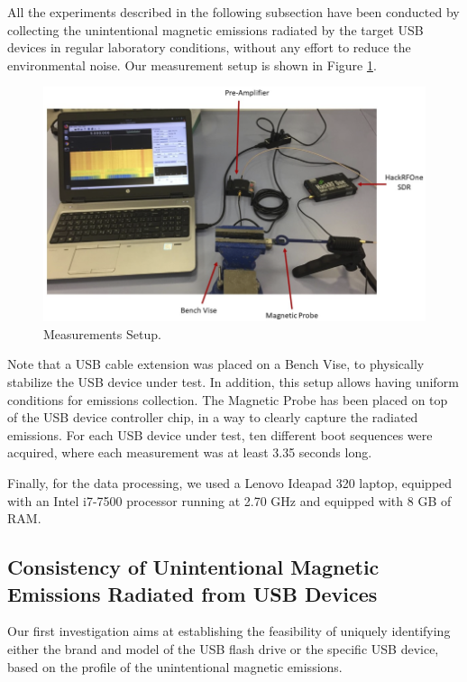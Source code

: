 \documentclass[acmsmall, authorversion]{acmart}
\begin{document}
All the experiments described in the following subsection have been conducted by collecting the unintentional magnetic emissions radiated by the target USB devices in regular laboratory conditions, without any effort to reduce the environmental noise. Our measurement setup is shown in Figure \ref{fig:setup}. 
\begin{figure}[htbp]
    \includegraphics[width=.5\columnwidth]{Figures/setup_labels.png}
    \centering
    \caption{Measurements Setup.}
    \label{fig:setup}
\end{figure}

Note that a USB cable extension was placed on a Bench Vise, to physically stabilize the USB device under test. In addition, this setup allows having uniform conditions for emissions collection. The Magnetic Probe has been placed on top of the USB device controller chip, in a way to clearly capture the radiated emissions. 
For each USB device under test, ten different boot sequences were acquired, where each measurement was at least 3.35 seconds long.

Finally, for the data processing, we used a Lenovo Ideapad 320 laptop, equipped with an Intel i7-7500 processor running at 2.70 GHz and equipped with 8 GB of RAM.

\subsection{Consistency of Unintentional Magnetic Emissions Radiated from USB Devices}
\label{sec:consistency}

Our first investigation aims at establishing the feasibility of uniquely identifying either the brand and model of the USB flash drive or the specific USB device, based on the profile of the unintentional magnetic emissions.
\end{document}
